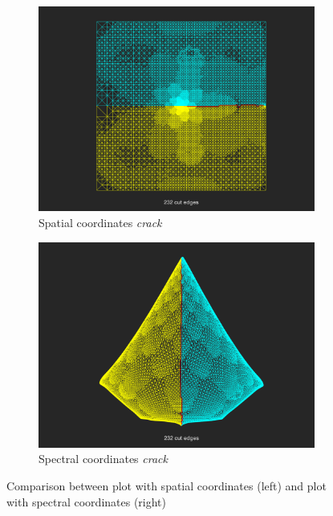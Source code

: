 \documentclass[unicode,11pt,a4paper,oneside,numbers=endperiod,openany]{scrartcl}
\begin{document}
\begin{enumerate}
\begin{figure}[h!]
\begin{subfigure}[b]{0.45\textwidth}
		\includegraphics[width=\textwidth]{images/crack_normal.png}
		\caption{Spatial coordinates \textit{crack}}
		\end{subfigure}
		\hfill
		\begin{subfigure}[b]{0.45\textwidth}
		\includegraphics[width=\textwidth]{images/crack_strange.png}
		\caption{Spectral coordinates \textit{crack}}
		\end{subfigure}
		\caption{Comparison between plot with spatial coordinates (left) and plot with spectral coordinates (right)}
		\label{fig:spatspec}
	\end{figure}


\end{enumerate}






%
%
\end{document}
